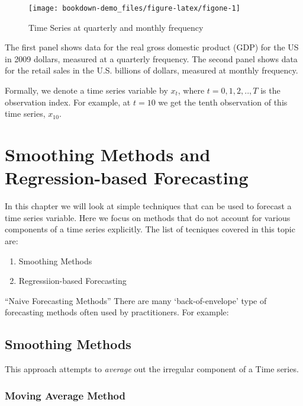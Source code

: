 \documentclass[]{book}
\providecommand{\tightlist}{%
  \setlength{\itemsep}{0pt}\setlength{\parskip}{0pt}}
\theoremstyle{definition}
\theoremstyle{definition}
\theoremstyle{definition}
\theoremstyle{remark}
\begin{document}
\begin{figure}

{\centering \texttt{[image: bookdown-demo\_files/figure-latex/figone-1]} 

}

\caption{Time Series at quarterly and monthly frequency}\label{fig:figone}
\end{figure}

The first panel shows data for the real gross domestic product (GDP) for
the US in 2009 dollars, measured at a quarterly frequency. The second
panel shows data for the retail sales in the U.S. billions of dollars,
measured at monthly frequency.

Formally, we denote a time series variable by \(x_t\), where
\(t=0,1,2,..,T\) is the observation index. For example, at \(t=10\) we
get the tenth observation of this time series, \(x_{10}\).

\chapter{Smoothing Methods and Regression-based
Forecasting}\label{smoothing-methods-and-regression-based-forecasting}

In this chapter we will look at simple techniques that can be used to
forecast a time series variable. Here we focus on methods that do not
account for various components of a time series explicitly. The list of
tecniques covered in this topic are:

\begin{enumerate}
\def\labelenumi{\arabic{enumi}.}
\tightlist
\item
  Smoothing Methods
\item
  Regressiion-based Forecasting
\end{enumerate}

``Naive Forecasting Methods'' There are many `back-of-envelope' type of
forecasting methods often used by practitioners. For example:

\section{Smoothing Methods}\label{smoothing-methods}

This approach attempts to \emph{average} out the irregular component of
a Time series.

\subsection{Moving Average Method}\label{moving-average-method}
\end{document}
